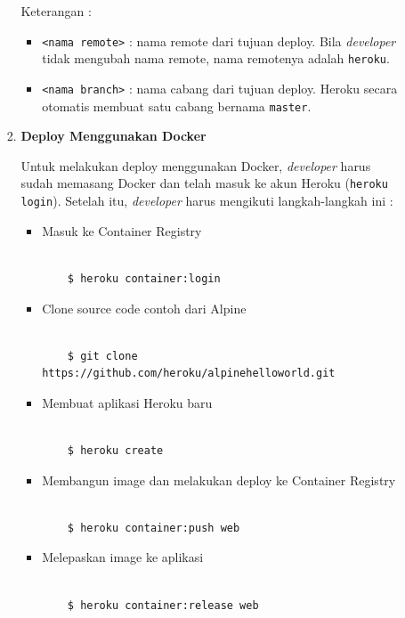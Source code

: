 \documentclass[a4paper,twoside]{article}
\begin{document}
\begin{enumerate}
\begin{enumerate}
\begin{enumerate}
\begin{lstlisting}
\end{lstlisting}
Keterangan :
\begin{itemize}
\item \texttt{<nama remote>} : nama remote dari tujuan deploy. Bila \textit{developer} tidak mengubah nama remote, nama remotenya adalah \texttt{heroku}. 
\item \texttt{<nama branch>} : nama cabang dari tujuan deploy. Heroku secara otomatis membuat satu cabang bernama \texttt{master}.
\end{itemize}

\item \textbf{Deploy Menggunakan Docker}

Untuk melakukan deploy menggunakan Docker, \textit{developer} harus sudah memasang Docker dan telah masuk ke akun Heroku (\texttt{heroku login}). Setelah itu, \textit{developer} harus mengikuti langkah-langkah ini :
\begin{itemize}
\item Masuk ke Container Registry
\begin{lstlisting}

	$ heroku container:login

\end{lstlisting}

\item Clone source code contoh dari Alpine
\begin{lstlisting}

	$ git clone https://github.com/heroku/alpinehelloworld.git

\end{lstlisting}

\item Membuat aplikasi Heroku baru
\begin{lstlisting}

	$ heroku create

\end{lstlisting}

\item Membangun image dan melakukan deploy ke Container Registry
\begin{lstlisting}

	$ heroku container:push web

\end{lstlisting}

\item Melepaskan image ke aplikasi
\begin{lstlisting}

	$ heroku container:release web


\end{lstlisting}
\end{itemize}
\end{enumerate}
\end{enumerate}
\end{enumerate}
\end{document}
